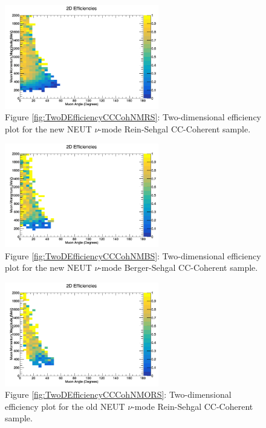 \documentclass[11pt]{article}
\begin{document}
\begin{figure}[H]
\centering
\includegraphics[width=0.6\textwidth]{CCCohPlots/2DEffNMRS.png}
\caption*{Figure \ref*{fig:TwoDEfficiencyCCCohNMRS}: Two-dimensional efficiency plot for the new NEUT $\nu$-mode Rein-Sehgal CC-Coherent sample.}
\end{figure}\label{fig:TwoDEfficiencyCCCohNMRS}

\begin{figure}[H]
\centering
\includegraphics[width=0.6\textwidth]{CCCohPlots/2DEffNMBS.png}
\caption*{Figure \ref*{fig:TwoDEfficiencyCCCohNMBS}: Two-dimensional efficiency plot for the new NEUT $\nu$-mode Berger-Sehgal CC-Coherent sample.}
\end{figure}\label{fig:TwoDEfficiencyCCCohNMBS}

\begin{figure}[H]
\centering
\includegraphics[width=0.6\textwidth]{CCCohPlots/2DEffNMORS.png}
\caption*{Figure \ref*{fig:TwoDEfficiencyCCCohNMORS}: Two-dimensional efficiency plot for the old NEUT $\nu$-mode Rein-Sehgal CC-Coherent sample.}
\end{figure}\label{fig:TwoDEfficiencyCCCohNMORS}
\end{document}
